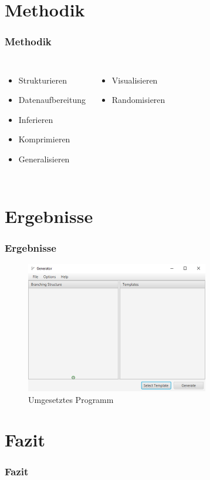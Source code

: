 \documentclass[12pt]{beamer}
\begin{document}
    \section{Methodik}
    \label{sec:methodik}
    \begin{frame}
        \frametitle{Methodik}

        \begin{columns}
            \begin{itemize}
                \setlength\itemsep{1em}
                \item Strukturieren
                \item Datenaufbereitung
                \item Inferieren
                \item Komprimieren
                \item Generalisieren
            \end{itemize}

            \begin{itemize}
                \setlength\itemsep{1em}
                \item Visualisieren
                \item Randomisieren
            \end{itemize}
        \end{columns}
    \end{frame}

    \section{Ergebnisse}
    \label{sec:ergebnisse}
    \begin{frame}
        \frametitle{Ergebnisse}

        \begin{figure}
            \centering
            \includegraphics[width=8cm,cfbox=blue 0.4pt 1pt]{../images/UI.PNG}
            \caption{Umgesetztes Programm}
        \end{figure}
    \end{frame}

    \section{Fazit}
    \label{sec:fazit}
    \begin{frame}
        \frametitle{Fazit}
    \end{frame}
\end{document}
